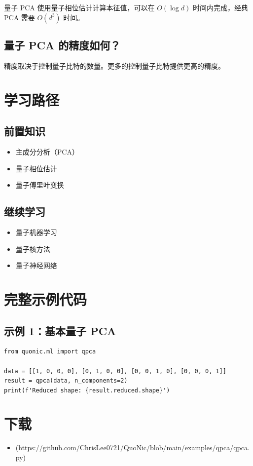 \documentclass[12pt,a4paper]{article}
\begin{document}
量子 PCA 使用量子相位估计计算本征值，可以在 $O(\log d)$ 时间内完成，经典 PCA 需要 $O(d^3)$ 时间。

\subsection{量子 PCA 的精度如何？}

精度取决于控制量子比特的数量。更多的控制量子比特提供更高的精度。

\section{学习路径}

\subsection{前置知识}
\begin{itemize}
  \item 主成分分析（PCA）
  \item 量子相位估计
  \item 量子傅里叶变换
\end{itemize}

\subsection{继续学习}
\begin{itemize}
  \item 量子机器学习
  \item 量子核方法
  \item 量子神经网络
\end{itemize}

\section{完整示例代码}

\subsection{示例 1：基本量子 PCA}

\begin{verbatim}
from quonic.ml import qpca

data = [[1, 0, 0, 0], [0, 1, 0, 0], [0, 0, 1, 0], [0, 0, 0, 1]]
result = qpca(data, n_components=2)
print(f'Reduced shape: {result.reduced.shape}')
\end{verbatim}

\section{下载}

\begin{itemize}
  \item [qpca.py](https://github.com/ChrisLee0721/QuoNic/blob/main/examples/qpca/qpca.py)
\end{itemize}
\end{document}
